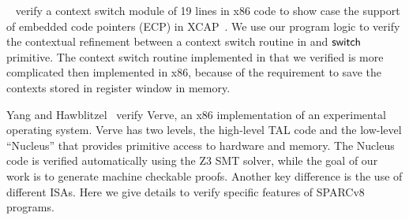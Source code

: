 ~\cite{ctxm} verify a context switch module of 19 lines
in x86 code to show case the support of embedded
code pointers (ECP) in XCAP~\cite{xcap}. 
We use our program logic to verify the contextual 
refinement between a context switch routine in \sparc{} 
and $\mathsf{switch}{}$ primitive. The context switch routine 
implemented in \sparc{} that we verified 
is more complicated then 
implemented in x86, because of the requirement to save 
the contexts stored in register window in memory.

Yang and Hawblitzel~\cite{YangPLDI10} verify Verve, an x86 
implementation of an experimental operating system. Verve has two 
levels, the high-level TAL code and the low-level ``Nucleus'' 
that provides primitive access to hardware and memory. 
The Nucleus code is verified automatically using the Z3 SMT solver,
while the goal of our work is to generate machine checkable proofs.
Another key difference is the use of different ISAs. Here
we give details to verify specific features of SPARCv8 programs.

